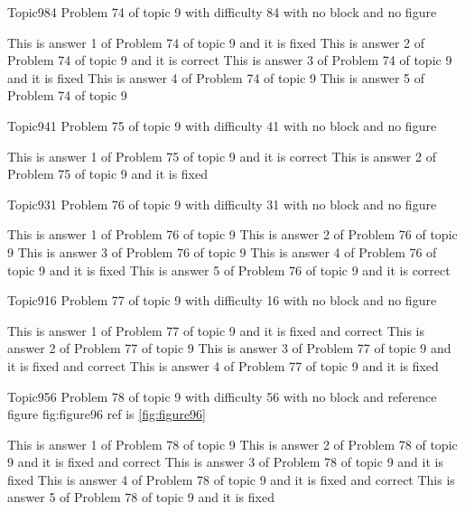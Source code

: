 \documentclass[master]{exam}
\begin{document}
\begin{problem}{Topic9}{84}
	Problem 74 of topic 9 with difficulty 84 with no block and no figure
	\begin{answers}
		\answer[fixed] This is answer 1 of Problem 74 of topic 9 and it is fixed
		\answer[correct] This is answer 2 of Problem 74 of topic 9 and it is correct
		\answer[fixed] This is answer 3 of Problem 74 of topic 9 and it is fixed
		\answer This is answer 4 of Problem 74 of topic 9 
		\answer This is answer 5 of Problem 74 of topic 9 
	\end{answers}
\end{problem}

\begin{problem}{Topic9}{41}
	Problem 75 of topic 9 with difficulty 41 with no block and no figure
	\begin{answers}
		\answer[correct] This is answer 1 of Problem 75 of topic 9 and it is correct
		\answer[fixed] This is answer 2 of Problem 75 of topic 9 and it is fixed
	\end{answers}
\end{problem}

\begin{problem}{Topic9}{31}
	Problem 76 of topic 9 with difficulty 31 with no block and no figure
	\begin{answers}
		\answer This is answer 1 of Problem 76 of topic 9 
		\answer This is answer 2 of Problem 76 of topic 9 
		\answer This is answer 3 of Problem 76 of topic 9 
		\answer[fixed] This is answer 4 of Problem 76 of topic 9 and it is fixed
		\answer[correct] This is answer 5 of Problem 76 of topic 9 and it is correct
	\end{answers}
\end{problem}

\begin{problem}{Topic9}{16}
	Problem 77 of topic 9 with difficulty 16 with no block and no figure
	\begin{answers}
		 This is answer 1 of Problem 77 of topic 9 and it is fixed and correct
		\answer This is answer 2 of Problem 77 of topic 9 
		 This is answer 3 of Problem 77 of topic 9 and it is fixed and correct
		\answer[fixed] This is answer 4 of Problem 77 of topic 9 and it is fixed
	\end{answers}
\end{problem}

\begin{problem}{Topic9}{56}
	Problem 78 of topic 9 with difficulty 56 with no block and reference figure fig:figure96 ref is \ref{fig:figure96}
	\begin{answers}
		\answer This is answer 1 of Problem 78 of topic 9 
		 This is answer 2 of Problem 78 of topic 9 and it is fixed and correct
		\answer[fixed] This is answer 3 of Problem 78 of topic 9 and it is fixed
		 This is answer 4 of Problem 78 of topic 9 and it is fixed and correct
		\answer[fixed] This is answer 5 of Problem 78 of topic 9 and it is fixed
	\end{answers}
\end{problem}
\end{document}
